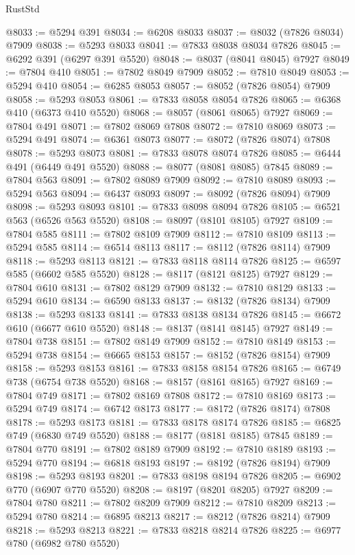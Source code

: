 \begin{lexlean}{RustStd}
\begin{coremodule}
@8033 := @5294 @391
@8034 := @6208 @8033
@8037 := @8032 (@7826 @8034) @7909
@8038 := @5293 @8033
@8041 := @7833 @8038 @8034 @7826
@8045 := @6292 @391 (@6297 @391 @5520)
@8048 := @8037 (@8041 @8045) @7927
@8049 := @7804 @410
@8051 := @7802 @8049 @7909
@8052 := @7810 @8049
@8053 := @5294 @410
@8054 := @6285 @8053
@8057 := @8052 (@7826 @8054) @7909
@8058 := @5293 @8053
@8061 := @7833 @8058 @8054 @7826
@8065 := @6368 @410 (@6373 @410 @5520)
@8068 := @8057 (@8061 @8065) @7927
@8069 := @7804 @491
@8071 := @7802 @8069 @7808
@8072 := @7810 @8069
@8073 := @5294 @491
@8074 := @6361 @8073
@8077 := @8072 (@7826 @8074) @7808
@8078 := @5293 @8073
@8081 := @7833 @8078 @8074 @7826
@8085 := @6444 @491 (@6449 @491 @5520)
@8088 := @8077 (@8081 @8085) @7845
@8089 := @7804 @563
@8091 := @7802 @8089 @7909
@8092 := @7810 @8089
@8093 := @5294 @563
@8094 := @6437 @8093
@8097 := @8092 (@7826 @8094) @7909
@8098 := @5293 @8093
@8101 := @7833 @8098 @8094 @7826
@8105 := @6521 @563 (@6526 @563 @5520)
@8108 := @8097 (@8101 @8105) @7927
@8109 := @7804 @585
@8111 := @7802 @8109 @7909
@8112 := @7810 @8109
@8113 := @5294 @585
@8114 := @6514 @8113
@8117 := @8112 (@7826 @8114) @7909
@8118 := @5293 @8113
@8121 := @7833 @8118 @8114 @7826
@8125 := @6597 @585 (@6602 @585 @5520)
@8128 := @8117 (@8121 @8125) @7927
@8129 := @7804 @610
@8131 := @7802 @8129 @7909
@8132 := @7810 @8129
@8133 := @5294 @610
@8134 := @6590 @8133
@8137 := @8132 (@7826 @8134) @7909
@8138 := @5293 @8133
@8141 := @7833 @8138 @8134 @7826
@8145 := @6672 @610 (@6677 @610 @5520)
@8148 := @8137 (@8141 @8145) @7927
@8149 := @7804 @738
@8151 := @7802 @8149 @7909
@8152 := @7810 @8149
@8153 := @5294 @738
@8154 := @6665 @8153
@8157 := @8152 (@7826 @8154) @7909
@8158 := @5293 @8153
@8161 := @7833 @8158 @8154 @7826
@8165 := @6749 @738 (@6754 @738 @5520)
@8168 := @8157 (@8161 @8165) @7927
@8169 := @7804 @749
@8171 := @7802 @8169 @7808
@8172 := @7810 @8169
@8173 := @5294 @749
@8174 := @6742 @8173
@8177 := @8172 (@7826 @8174) @7808
@8178 := @5293 @8173
@8181 := @7833 @8178 @8174 @7826
@8185 := @6825 @749 (@6830 @749 @5520)
@8188 := @8177 (@8181 @8185) @7845
@8189 := @7804 @770
@8191 := @7802 @8189 @7909
@8192 := @7810 @8189
@8193 := @5294 @770
@8194 := @6818 @8193
@8197 := @8192 (@7826 @8194) @7909
@8198 := @5293 @8193
@8201 := @7833 @8198 @8194 @7826
@8205 := @6902 @770 (@6907 @770 @5520)
@8208 := @8197 (@8201 @8205) @7927
@8209 := @7804 @780
@8211 := @7802 @8209 @7909
@8212 := @7810 @8209
@8213 := @5294 @780
@8214 := @6895 @8213
@8217 := @8212 (@7826 @8214) @7909
@8218 := @5293 @8213
@8221 := @7833 @8218 @8214 @7826
@8225 := @6977 @780 (@6982 @780 @5520)

\end{coremodule}
\end{lexlean}
